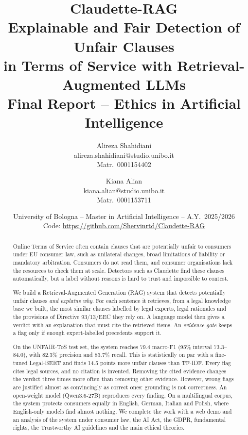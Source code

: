 \documentclass[10pt,a4paper]{article}
\title{\textbf{Claudette-RAG}\\[4pt]\textbf{Explainable and Fair Detection of Unfair Clauses}\\\textbf{in Terms of Service with Retrieval-Augmented LLMs}\\[8pt]
\large Final Report -- Ethics in Artificial Intelligence}
\author{
\begin{tabular}{c}
Alireza Shahidiani \\
alireza.shahidiani@studio.unibo.it \\
Matr.\ 0001154402
\end{tabular}
\and
\begin{tabular}{c}
Kiana Alian \\
kiana.alian@studio.unibo.it \\
Matr.\ 0001153711
\end{tabular}
}
\date{University of Bologna -- Master in Artificial Intelligence -- A.Y.\ 2025/2026\\[2pt]
Code: \url{https://github.com/Shervinrtd/Claudette-RAG}}
\begin{document}
\maketitle

\begin{abstract}
\noindent Online Terms of Service often contain clauses that are potentially unfair to consumers under EU consumer law, such as unilateral changes, broad limitations of liability or mandatory arbitration. Consumers do not read them, and consumer organisations lack the resources to check them at scale. Detectors such as Claudette find these clauses automatically, but a label without reasons is hard to trust and impossible to contest.

We build a Retrieval-Augmented Generation (RAG) system that detects potentially unfair clauses \emph{and explains why}. For each sentence it retrieves, from a legal knowledge base we built, the most similar clauses labelled by legal experts, legal rationales and the provisions of Directive 93/13/EEC they rely on. A language model then gives a verdict with an explanation that must cite the retrieved items. An \emph{evidence gate} keeps a flag only if enough expert-labelled precedents support it.

On the UNFAIR-ToS test set, the system reaches 79.4 macro-F1 (95\% interval 73.3--84.0), with 82.3\% precision and 83.7\% recall. This is statistically on par with a fine-tuned Legal-BERT and finds 14.5 points more unfair clauses than TF-IDF. Every flag cites legal sources, and no citation is invented. Removing the cited evidence changes the verdict three times more often than removing other evidence. However, wrong flags are justified almost as convincingly as correct ones: grounding is not correctness. An open-weight model (Qwen3.6-27B) reproduces every finding. On a multilingual corpus, the system protects consumers equally in English, German, Italian and Polish, where English-only models find almost nothing. We complete the work with a web demo and an analysis of the system under consumer law, the AI Act, the GDPR, fundamental rights, the Trustworthy AI guidelines and the main ethical theories.
\end{abstract}

\tableofcontents
\newpage



















\end{document}
